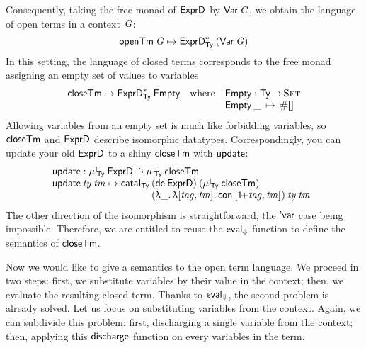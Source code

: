 \newcommand{\SYMBEmpty}{\F{Empty}\xspace}
\newcommand{\Empty}[1]{\SYMBEmpty\:#1}

\newcommand{\SYMBopenTerm}{\F{openTm}\xspace}
\newcommand{\openTerm}[1]{\SYMBopenTerm\: #1}
\newcommand{\closeTerm}{\F{closeTm}}

\newcommand{\update}{\F{update}}

Consequently, taking the free monad of \(\HExprD\) by \(\SYMBVar\:
\V{G}\), we obtain the language of open terms in a context \(\V{G}\):
%
\[
\openTerm{\V{G}} \mapsto \FreeIMonad{\HExprD}{\Ty}{(\SYMBVar\:\V{G})}
\]
%
In this setting, the language of closed terms corresponds to the free
monad assigning an empty set of values to variables
%
\[
\closeTerm \mapsto \FreeIMonad{\HExprD}{\Ty}{\SYMBEmpty}
\quad
\mbox{where}
\quad
\stk{
\SYMBEmpty : \Ty \To \Set \\
\begin{array}{@{}l@{\:\:\mapsto\:\:}l}
\Empty{\_}   & \Zero \\
\end{array}
}\]
%
Allowing variables from an empty set is much like forbidding variables,
so \(\closeTerm\) and \(\HExprD\) describe isomorphic
datatypes. Correspondingly, you can update your old \(\HExprD\) to a
shiny \(\closeTerm\) with \(\update\):
%
\[\stk{
\update : \muide{\Ty}{\HExprD} \DotTo \muide{\Ty}{\closeTerm} \\
\begin{array}{@{}l@{}l}
\update\: \V{ty}\: \V{tm} \mapsto \cataI_{\Ty}\: & (\toIDesc{\HExprD})\:
                                                  (\muide{\Ty}{\closeTerm})\: \\
                                                & (\LAM{\_} \LAM{\pair{\V{tag}}{\V{tm}}{}} \Con{\pair{\Su{\V{tag}}}{\V{tm}}{}})\:
                                                  \V{ty}\:
                                                  \V{tm}
\end{array}
}\]
% 
The other direction of the isomorphism is straightforward, the
$\SYMBDVar$ case being impossible. Therefore, we are entitled to
reuse the $\evalH$ function to define the semantics of $\closeTerm$.

\newcommand{\discharge}{\F{discharge}}

Now we would like to give a semantics to the open term language. We
proceed in two steps: first, we substitute variables by their value in
the context; then, we evaluate the resulting closed term. Thanks to
$\evalH$, the second problem is already solved. Let us focus on
substituting variables from the context. Again, we can subdivide this
problem: first, discharging a single variable from the context; then,
applying this $\discharge$ function on every variables in the term.

